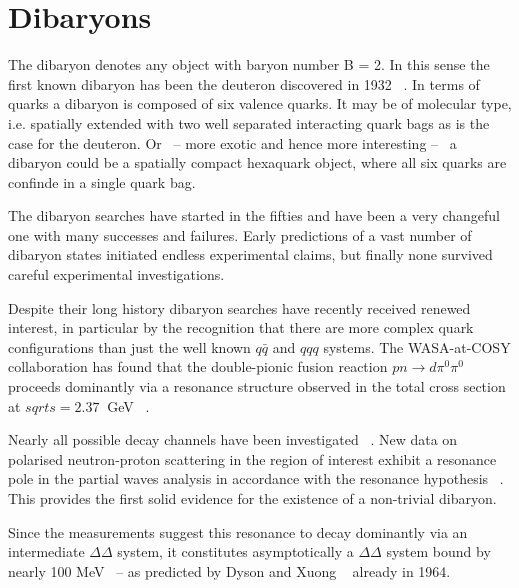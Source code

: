 %
\chapter{Dibaryons} \label{sec:2}


The dibaryon denotes any object with baryon number B = 2. In this sense the first known dibaryon
has been the deuteron discovered in 1932 ~\cite{deu_disc}.
In terms of quarks a dibaryon is composed of six valence quarks.
It may be of molecular type, i.e. spatially extended with two well separated interacting quark 
bags as is the case for the deuteron. Or \ -- more exotic and hence more interesting -- \ a dibaryon
could be a spatially compact hexaquark object, where all six quarks are confinde in a single quark bag.

The dibaryon searches have started in the fifties and have been a very changeful one with many 
successes and failures. 
Early predictions of a vast number of dibaryon states initiated endless experimental claims,
but finally none survived careful experimental investigations. 

Despite their long history dibaryon searches have recently received renewed interest,
in particular by the recognition that there are more complex quark configurations than just the well known
$q\bar{q}$ and $qqq$ systems.
The WASA-at-COSY collaboration has found that the double-pionic fusion reaction $pn \rightarrow 
d \pi^{0} \pi^{0}$ proceeds dominantly via a resonance structure observed in the total cross section at 
$sqrt{s} = 2.37\ $ GeV ~\cite{wasa1}.


Nearly all possible decay channels have been investigated ~\cite{wasa2, wasa3, wasa4}.
New data on polarised neutron-proton scattering in the region of interest exhibit a resonance pole in 
the partial waves analysis in accordance with the resonance hypothesis ~\cite{wasa5,wasa6}.
This provides the first solid evidence for the existence of a non-trivial dibaryon.

Since the measurements suggest this resonance to decay dominantly via an intermediate $\Delta \Delta$ system,
it constitutes asymptotically a $\Delta \Delta$ system bound by nearly 100 MeV \ -- as predicted by Dyson and
Xuong ~\cite{dysonxuong} already in 1964.


